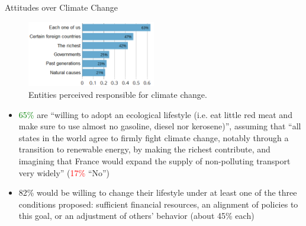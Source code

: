 \documentclass[aspectratio=169,9pt,dvipsnames]{beamer}
\begin{document}
    \begin{frame}{Attitudes over Climate Change}

\begin{figure}

  \caption{Entities perceived responsible for climate change.}
  \includegraphics[width=0.5\textwidth]{Images/CC_responsiblec.png}
\end{figure}

\begin{itemize}
    \item \textcolor{Green}{65\%} are ``willing to adopt an ecological lifestyle (i.e. eat little red meat and make sure to use almost no gasoline, diesel nor kerosene)'', assuming that ``all states in the world agree to firmly fight climate change, notably through a transition to renewable energy, by making
the richest contribute, and imagining that France would expand the supply of non-polluting transport very widely'' (\textcolor{red}{17\%} ``No'')
    \item 82\% would be willing to change their lifestyle under at least one of the three conditions proposed: sufficient financial resources, an alignment of policies to this goal, or an adjustment of others’ behavior (about 45\% each)
\end{itemize}

    \end{frame}
    
\end{document}
